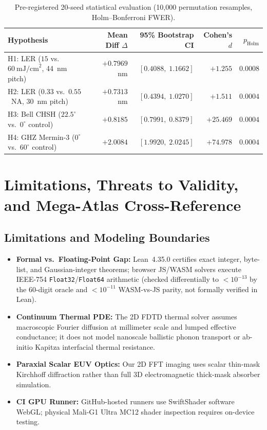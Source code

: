 \documentclass[11pt,a4paper]{amsart}
\newcommand{\code}[1]{{\small\nolinkurl{#1}}}
\theoremstyle{remark}
\begin{document}
\begin{table}[htbp]
\centering
\caption{Pre-registered 20-seed statistical evaluation (10,000 permutation resamples, Holm--Bonferroni FWER).}
\label{tab:stats}
\footnotesize
\begin{tabular}{@{}lrrrr@{}}
\toprule
Hypothesis & Mean Diff $\Delta$ & 95\% Bootstrap CI & Cohen's $d$ & $p_{\text{Holm}}$ \\
\midrule
H1: LER ($15$ vs.\ $60~\text{mJ/cm}^2$, 44~nm pitch) & $+0.7969$~nm & $[0.4088,\; 1.1662]$ & $+1.255$ & $0.0008$ \\
H2: LER ($0.33$ vs.\ $0.55$~NA, 30~nm pitch) & $+0.7313$~nm & $[0.4394,\; 1.0270]$ & $+1.511$ & $0.0004$ \\
H3: Bell CHSH ($22.5^\circ$ vs.\ $0^\circ$ control) & $+0.8185$ & $[0.7991,\; 0.8379]$ & $+25.469$ & $0.0004$ \\
H4: GHZ Mermin-3 ($0^\circ$ vs.\ $60^\circ$ control) & $+2.0084$ & $[1.9920,\; 2.0245]$ & $+74.978$ & $0.0004$ \\
\bottomrule
\end{tabular}
\end{table}

\section{Limitations, Threats to Validity, and Mega-Atlas Cross-Reference}
\label{sec:mega-atlas}

\subsection{Limitations and Modeling Boundaries}
\begin{itemize}
  \item \textbf{Formal vs.\ Floating-Point Gap:} Lean~4.35.0 certifies exact
  integer, byte-list, and Gaussian-integer theorems; browser JS/WASM solvers
  execute IEEE-754 \code{Float32}/\code{Float64} arithmetic (checked
  differentially to $< 10^{-13}$ by the 60-digit oracle and $< 10^{-11}$
  WASM-vs-JS parity, not formally verified in Lean).
  \item \textbf{Continuum Thermal PDE:} The 2D FDTD thermal solver assumes
  macroscopic Fourier diffusion at millimeter scale and lumped effective
  conductance; it does not model nanoscale ballistic phonon transport or
  ab-initio Kapitza interfacial thermal resistance.
  \item \textbf{Paraxial Scalar EUV Optics:} Our 2D FFT imaging uses scalar
  thin-mask Kirchhoff diffraction rather than full 3D electromagnetic
  thick-mask absorber simulation.
  \item \textbf{CI GPU Runner:} GitHub-hosted runners use SwiftShader software
  WebGL; physical Mali-G1 Ultra MC12 shader inspection requires on-device testing.
\end{itemize}
\end{document}
